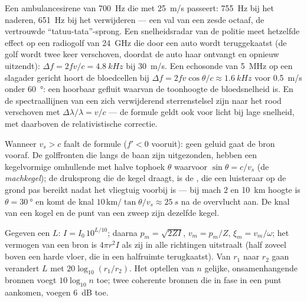 \begin{example}\label{ex:b2:sound-waves:dopplerex}
Een ambulancesirene van \qty{700}{Hz} die met \qty{25}{m/s} passeert:
\qty{755}{Hz} bij het naderen, \qty{651}{Hz} bij het verwijderen --- een val
van een zesde octaaf, de vertrouwde ``tatuu-tata''-sprong. Een
snelheidsradar van de politie meet hetzelfde effect op een radiogolf van
\qty{24}{GHz} die door een auto wordt teruggekaatst (de golf wordt twee keer
verschoven, doordat de auto haar ontvangt en opnieuw uitzendt):
$\Delta f = 2fv/c =
\qty{4.8}{kHz}$ bij \qty{30}{m/s}. Een echosonde van
\qty{5}{MHz} op een slagader gericht hoort de bloedcellen bij
$\Delta f = 2fv\cos\theta/c \approx \qty{1.6}{kHz}$ voor \qty{0.5}{m/s}
onder \qty{60}{\degree}: een hoorbaar gefluit waarvan de toonhoogte de
bloedsnelheid is. En de spectraallijnen van een zich verwijderend
sterrenstelsel zijn naar het rood verschoven met
$\Delta\lambda/\lambda = v/c$ --- de formule geldt ook voor licht bij lage
snelheid, met daarboven de relativistische correctie.
\end{example}

\begin{remark}[Supersonisch]\label{rem:b2:sound-waves:mach}
Wanneer $v_s > c$ faalt de formule ($f' < 0$ vooruit): geen geluid gaat de
bron vooraf. De golffronten die langs de baan zijn uitgezonden, hebben een
kegelvormige omhullende met halve tophoek $\theta$ waarvoor
$\sin\theta = c/v_s$ (de \emph{machkegel}); de druksprong die de kegel
draagt, is de , die een luisteraar op de grond pas bereikt
nadat het vliegtuig voorbij is --- bij mach $2$ en \qty{10}{km} hoogte is
$\theta = \qty{30}{\degree}$ en komt de knal
$10\,\text{km}/\tan\theta/v_s \approx \qty{25}{s}$ na de overvlucht aan. De
knal van een kogel en de punt van een zweep zijn dezelfde kegel.
\end{remark}

\begin{method}\label{met:b2:sound-waves:method}
Gegeven een  $L$: $I = I_0\,10^{L/10}$; daarna
$p_m = \sqrt{2ZI}$, $v_m = p_m/Z$, $\xi_m = v_m/\omega$; het vermogen van
een bron is $4\pi r^2I$ als zij in alle richtingen uitstraalt (half zoveel
boven een harde vloer, die in een halfruimte terugkaatst). Van $r_1$ naar
$r_2$ gaan verandert $L$ met $20\log_{10}(r_1/r_2)$. Het optellen van $n$
gelijke, onsamenhangende bronnen voegt $10\log_{10}n$ toe; twee coherente
bronnen die in fase in een punt aankomen, voegen \qty{6}{dB} toe.
\end{method}

